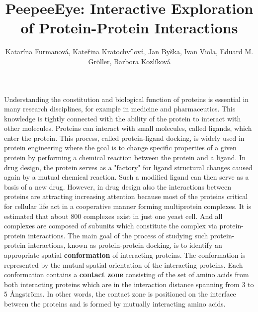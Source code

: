 \documentclass[journal]{vgtc}                %
\title{PeepeeEye: Interactive Exploration of Protein-Protein Interactions}
\author{Katar\'{i}na Furmanov\'{a}, Kate\v{r}ina Kratochv\'{i}lov\'{a}, Jan By\v{s}ka, Ivan Viola, Eduard M. Gr\"{o}ller, Barbora Kozl\'{i}kov\'{a}}
\begin{document}


\maketitle
Understanding the constitution and biological function of proteins is essential in many research disciplines, for example in medicine and pharmaceutics.
This knowledge is tightly connected with the ability of the protein to interact with other molecules.
Proteins can interact with small molecules, called ligands, which enter the protein.
This process, called protein-ligand docking, is widely used in protein engineering where the goal is to change specific properties of a given protein by performing a chemical reaction between the protein and a ligand.
In drug design, the protein serves as a "factory" for ligand structural changes caused again by a mutual chemical reaction. 
Such a modified ligand can then serve as a basis of a new drug. 
However, in drug design also the interactions between proteins are attracting increasing attention because most of the proteins critical for cellular life act in a cooperative manner forming multiprotein complexes. 
It is estimated that about 800 complexes exist in just one yeast cell. 
And all complexes are composed of subunits which constitute the complex via protein-protein interactions.
The main goal of the process of studying such protein-protein interactions, known as protein-protein docking, is to identify an appropriate spatial \textbf{conformation} of interacting proteins.
The conformation is represented by the mutual spatial orientation of the interacting proteins.
Each conformation contains a \textbf{contact zone} consisting of the set of amino acids from both interacting proteins which are in the interaction distance spanning from 3 to 5 \AA ngstr\"{o}ms.
In other words, the contact zone is positioned on the interface between the proteins and is formed by mutually interacting amino acids.
\end{document}
